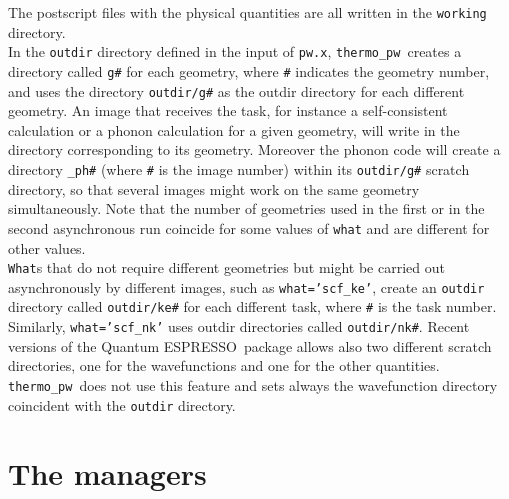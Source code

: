 \documentclass[12pt,a4paper]{article}
\def\qe{{\sc Quantum ESPRESSO}}
\def\thermo{{\texttt{thermo\_pw}}}
\begin{document}
The postscript files with the physical quantities are all written in
the \texttt{working} directory. \\
In the \texttt{outdir} directory defined in the input of \texttt{pw.x},
\thermo\ creates a directory called \texttt{g\#} for each geometry, 
where \texttt{\#} indicates the geometry number, and uses the directory 
\texttt{outdir/g\#} as the outdir directory for each different geometry. 
An image that receives the task, for instance a self-consistent calculation 
or a phonon calculation for a given geometry, will write in the directory 
corresponding to its geometry.
Moreover the phonon code will create a directory \texttt{\_ph\#} 
(where \texttt{\#} is the image number) within its \texttt{outdir/g\#} scratch 
directory, so that several images might work on the same geometry 
simultaneously.
Note that the number of geometries used in the first or in the second
asynchronous run coincide for some values of \texttt{what} and are
different for other values. \\
\texttt{What}s that do not require different geometries but might be carried
out asynchronously by different images, such as \texttt{what='scf\_ke'}, 
create an \texttt{outdir} directory called
\texttt{outdir/ke\#} for each different task, where \texttt{\#} is the
task number. Similarly, \texttt{what='scf\_nk'} uses outdir directories
called \texttt{outdir/nk\#}.
Recent versions of the \qe\ package allows also two different scratch
directories, one for the wavefunctions and one for the other quantities.
\thermo\ does not use this feature and sets always the wavefunction
directory coincident with the \texttt{outdir} directory.

\newpage
\section{\color{coral}The managers}
\end{document}

